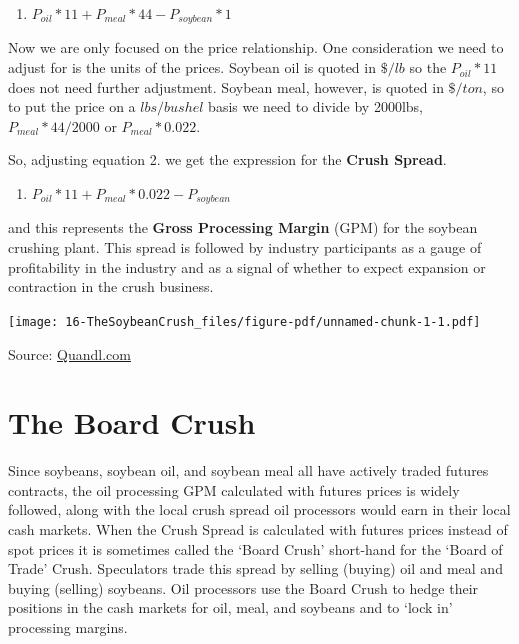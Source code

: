 \documentclass[
  letterpaper,
  DIV=11,
  numbers=noendperiod]{scrreprt}
\providecommand{\tightlist}{%
  \setlength{\itemsep}{0pt}\setlength{\parskip}{0pt}}\usepackage{longtable,booktabs,array}
\begin{document}
\begin{enumerate}
\def\labelenumi{\arabic{enumi}.}
\setcounter{enumi}{1}
\tightlist
\item
  \(P_{oil}*11 + P_{meal}*44 - P_{soybean}*1\)
\end{enumerate}

Now we are only focused on the price relationship. One consideration we
need to adjust for is the units of the prices. Soybean oil is quoted in
\(\$/lb\) so the \(P_{oil}*11\) does not need further adjustment.
Soybean meal, however, is quoted in \(\$/ton\), so to put the price on a
\(lbs/bushel\) basis we need to divide by 2000lbs, \(P_{meal}*44/2000\)
or \(P_{meal}*0.022\).

So, adjusting equation 2. we get the expression for the \textbf{Crush
Spread}.

\begin{enumerate}
\def\labelenumi{\arabic{enumi}.}
\setcounter{enumi}{2}
\tightlist
\item
  \(P_{oil}*11 + P_{meal}*0.022 - P_{soybean}\)
\end{enumerate}

and this represents the \textbf{Gross Processing Margin} (GPM) for the
soybean crushing plant. This spread is followed by industry participants
as a gauge of profitability in the industry and as a signal of whether
to expect expansion or contraction in the crush business.

\texttt{[image: 16-TheSoybeanCrush\_files/figure-pdf/unnamed-chunk-1-1.pdf]}

Source: \href{www.Quandl.com}{Quandl.com}

\hypertarget{the-board-crush}{%
\section{The Board Crush}\label{the-board-crush}}

Since soybeans, soybean oil, and soybean meal all have actively traded
futures contracts, the oil processing GPM calculated with futures prices
is widely followed, along with the local crush spread oil processors
would earn in their local cash markets. When the Crush Spread is
calculated with futures prices instead of spot prices it is sometimes
called the `Board Crush' short-hand for the `Board of Trade' Crush.
Speculators trade this spread by selling (buying) oil and meal and
buying (selling) soybeans. Oil processors use the Board Crush to hedge
their positions in the cash markets for oil, meal, and soybeans and to
`lock in' processing margins.
\end{document}
